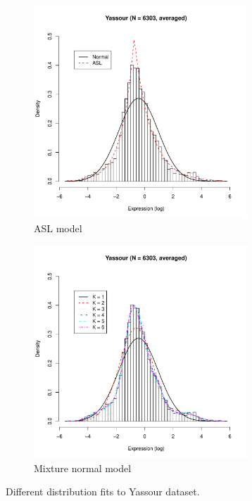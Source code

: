 \begin{figure}[h]
  \centering
  \begin{subfigure}[b]{.45\textwidth}
    \centering
    \includegraphics[height=8cm,width=8cm]{cubfits-include/figure/more_asl}
    \caption{ASL model}
    \label{fig:asl}
  \end{subfigure}
  \begin{subfigure}[b]{.45\textwidth}
    \centering
    \includegraphics[height=8cm,width=8cm]{cubfits-include/figure/more_mixture}
    \caption{Mixture normal model}
    \label{fig:mixture}
  \end{subfigure}
  \caption{Different distribution fits to Yassour dataset.}
  \label{fig:asl_mixture}
\end{figure}


